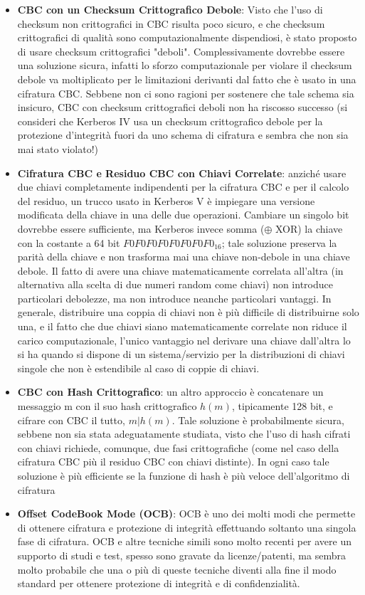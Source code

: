 \begin{itemize}
\item \textbf{CBC con un Checksum Crittografico Debole}: Visto che l'uso di checksum non crittografici in CBC risulta poco sicuro, e che checksum crittografici di qualità sono computazionalmente dispendiosi, è stato proposto di usare checksum crittografici "deboli". Complessivamente dovrebbe essere una soluzione sicura, infatti lo sforzo computazionale per violare il checksum debole va moltiplicato per le limitazioni derivanti dal fatto che è usato in una cifratura CBC. Sebbene non ci sono ragioni per sostenere che tale schema sia insicuro, CBC con checksum crittografici deboli non ha riscosso successo (si consideri che Kerberos IV usa un checksum crittografico debole per la protezione d'integrità fuori da uno schema di cifratura e sembra che non sia mai stato violato!)
\item \textbf{Cifratura CBC e Residuo CBC con Chiavi Correlate}: anziché usare due chiavi completamente indipendenti per la cifratura CBC e per il calcolo del residuo, un trucco usato in Kerberos V è impiegare una versione modificata della chiave in una delle due operazioni. Cambiare un singolo bit dovrebbe essere sufficiente, ma Kerberos invece somma ($\oplus$ XOR) la chiave con la costante a 64 bit $F0F0F0F0F0F0F0F0_{16}$; tale soluzione preserva la parità della chiave e non trasforma mai una chiave non-debole in una chiave debole. Il fatto di avere una chiave matematicamente correlata all'altra (in alternativa alla scelta di due numeri random come chiavi) non introduce particolari debolezze, ma non introduce neanche particolari vantaggi. In generale, distribuire una coppia di chiavi non è più difficile di distribuirne solo una, e il fatto che due chiavi siano matematicamente correlate non riduce il carico computazionale, l'unico vantaggio nel derivare una chiave dall'altra lo si ha quando si dispone di un sistema/servizio per la distribuzioni di chiavi singole che non è estendibile al caso di coppie di chiavi.
\item \textbf{CBC con Hash Crittografico}: un altro approccio è concatenare un messaggio m con il suo hash crittografico $h(m)$, tipicamente 128 bit, e cifrare con CBC il tutto, $m|h(m)$. Tale soluzione è probabilmente sicura, sebbene non sia stata adeguatamente studiata, visto che l'uso di hash cifrati con chiavi richiede, comunque, due fasi crittografiche (come nel caso della cifratura CBC più il residuo CBC con chiavi distinte). In ogni caso tale soluzione è più efficiente se la funzione di hash è più veloce dell'algoritmo di cifratura 
\item \textbf{Offset CodeBook Mode (OCB)}: OCB è uno dei molti modi che permette di ottenere cifratura e protezione di integrità effettuando soltanto una singola fase di cifratura. OCB e altre tecniche simili sono molto recenti per avere un supporto di studi e test, spesso sono gravate da licenze/patenti, ma sembra molto probabile che una o più di queste tecniche diventi alla fine il modo standard per ottenere protezione di integrità e di confidenzialità.
\end{itemize}

